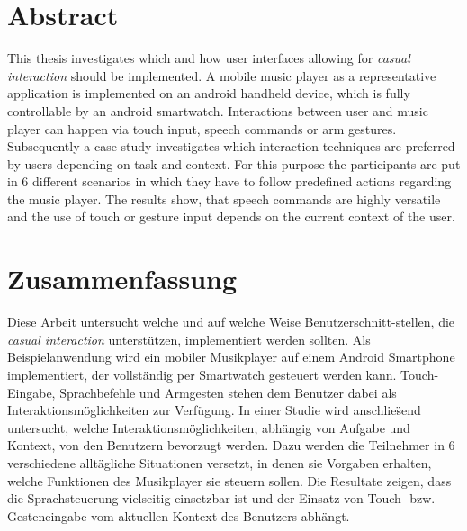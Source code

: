 \begingroup
\let\clearpage\relax
\let\cleardoublepage\relax
\let\cleardoublepage\relax

\chapter*{Abstract}
This thesis investigates which and how user interfaces allowing for \textit{casual interaction} should be implemented. A mobile music player as a representative application is implemented on an android handheld device, which is fully controllable by an android smartwatch. Interactions between user and music player can happen via touch input, speech commands or arm gestures. Subsequently a case study investigates which interaction techniques are preferred by users depending on task and context. For this purpose the participants are put in 6 different scenarios in which they have to follow predefined actions regarding the music player. The results show, that speech commands are highly versatile and the use of touch or gesture input depends on the current context of the user.


\vfill

\chapter*{Zusammenfassung}
Diese Arbeit untersucht welche und auf welche Weise Benutzerschnitt-stellen, die \textit{casual interaction} unterst\"utzen, implementiert werden sollten. Als Beispielanwendung wird ein mobiler Musikplayer auf einem Android Smartphone implementiert, der vollst\"andig per Smartwatch gesteuert werden kann. Touch-Eingabe, Sprachbefehle und Armgesten stehen dem Benutzer dabei als Interaktionsm\"oglichkeiten zur Verf\"ugung. In einer Studie wird anschlie\"send untersucht, welche Interaktionsm\"oglichkeiten, abh\"angig von Aufgabe und Kontext, von den Benutzern bevorzugt werden. Dazu werden die Teilnehmer in 6 verschiedene allt\"agliche Situationen versetzt, in denen sie Vorgaben erhalten, welche Funktionen des Musikplayer sie steuern sollen. Die Resultate zeigen, dass die Sprachsteuerung vielseitig einsetzbar ist und der Einsatz von Touch- bzw. Gesteneingabe vom aktuellen Kontext des Benutzers abh\"angt.


\endgroup			

\vfill